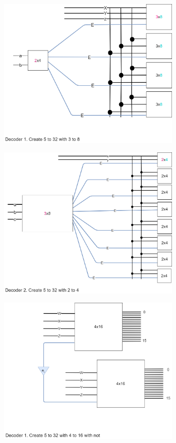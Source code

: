 \documentclass[20pt, a4paper]{article}
\begin{document}
\begin{figure}[htbp]\centering
	\centerline{\includegraphics[width=250pt]{Decoders/decoder1.png}}
\end{figure}

\begin{figure}[htbp]\centering
	\centerline{\includegraphics[width=250pt]{Decoders/decoder2.png}}
\end{figure}

\begin{figure}[htbp]\centering
	\centerline{\includegraphics[width=250pt]{Decoders/decoders3.png}}
\end{figure}
\end{document}
